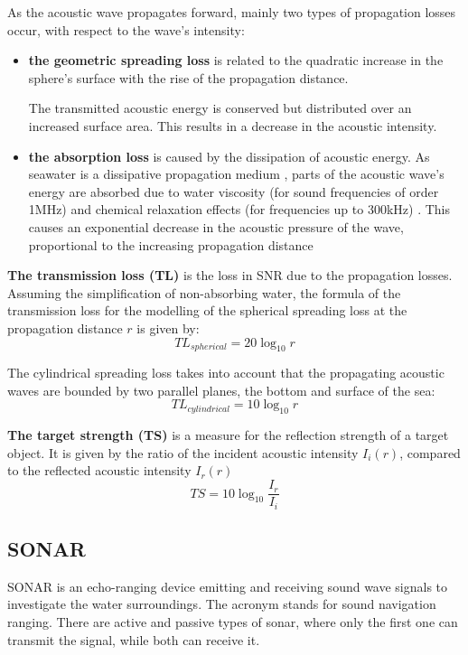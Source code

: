 \documentclass[11pt]{article}
\begin{document}
As the acoustic wave propagates forward, mainly two types of propagation losses occur, with respect to the wave’s intensity:
\begin{itemize}
\item \textbf{the geometric spreading loss} is related to the quadratic increase in the sphere’s surface with the rise of the propagation distance. 

The transmitted acoustic energy is conserved but distributed over an increased surface area. This results in a decrease in the acoustic intensity.
\item \textbf{the absorption loss} is caused by the dissipation of acoustic energy.
As seawater is a dissipative propagation medium \cite{lurton2002introduction}, parts of the acoustic wave’s energy are absorbed due to water viscosity (for sound frequencies of order 1MHz) and chemical relaxation effects (for frequencies up to 300kHz)  \cite{ainslie_principles_2010}. This causes an exponential decrease in the acoustic pressure of the wave, proportional to the increasing propagation distance
\end{itemize}

\textbf{The transmission loss (TL)} is the loss in SNR due to the propagation losses. Assuming the simplification of non-absorbing water, the formula of the transmission loss for the modelling of the spherical spreading loss at the propagation distance $r$  is given by:
\begin{equation}
TL_{spherical} = 20\log_{10}r
\label{eq:transmission_loss_sph}
\end{equation}

The cylindrical spreading loss takes into account that the propagating acoustic waves are bounded by two parallel planes, the bottom and surface of the sea:
\begin{equation}
TL_{cylindrical} = 10\log_{10}r
\label{eq:transmission_loss_cyl}
\end{equation}

\textbf{The target strength (TS)} is a measure for the reflection strength of a target object. It is given by the ratio of the incident acoustic intensity $I_{i}(r)$, compared to the reflected acoustic intensity $I_{r}(r)$
\begin{equation}
TS = 10\log_{10}\frac{I_r}{I_i}
\label{eq:target_strength_gen}
\end{equation}

\subsection{SONAR}
	SONAR is an echo-ranging device emitting and receiving sound wave signals to investigate the water surroundings. The acronym stands for sound navigation ranging. There are active and passive types of sonar, where only the first one can transmit the signal, while both can receive it.
	
\end{document}
